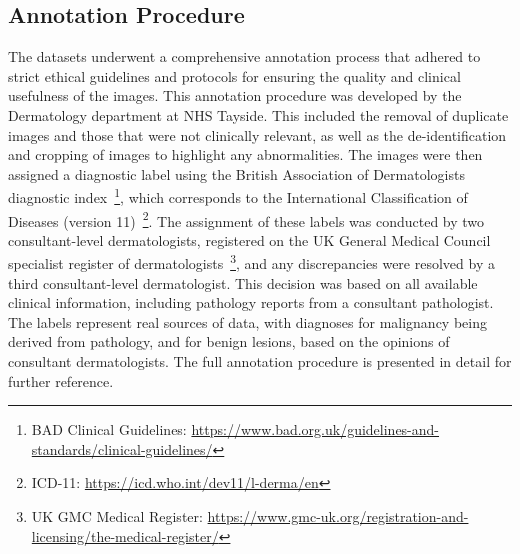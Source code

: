 \subsection{Annotation Procedure}
\label{subsec:annotation_procedure}
The datasets underwent a comprehensive annotation process that adhered to strict ethical guidelines and protocols for ensuring the quality and clinical usefulness of the images. This annotation procedure was developed by the Dermatology department at NHS Tayside. This included the removal of duplicate images and those that were not clinically relevant, as well as the de-identification and cropping of images to highlight any abnormalities. The images were then assigned a diagnostic label using the British Association of Dermatologists diagnostic index~\footnote{BAD Clinical Guidelines: \url{https://www.bad.org.uk/guidelines-and-standards/clinical-guidelines/}}, which corresponds to the International Classification of Diseases (version 11)~\footnote{ICD-11: \url{https://icd.who.int/dev11/l-derma/en}}. The assignment of these labels was conducted by two consultant-level dermatologists, registered on the UK General Medical Council specialist register of dermatologists~\footnote{UK GMC Medical Register: \url{https://www.gmc-uk.org/registration-and-licensing/the-medical-register/}}, and any discrepancies were resolved by a third consultant-level dermatologist. This decision was based on all available clinical information, including pathology reports from a consultant pathologist. The labels represent real sources of data, with diagnoses for malignancy being derived from pathology, and for benign lesions, based on the opinions of consultant dermatologists. The full annotation procedure is presented in detail for further reference.


